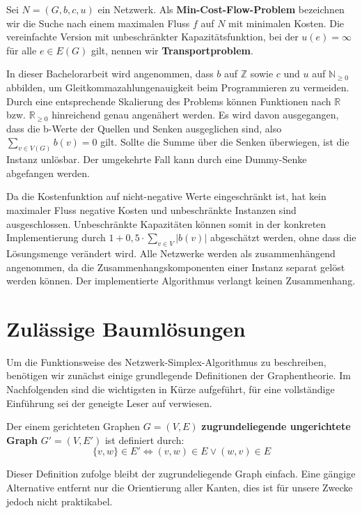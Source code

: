 \begin{defn}\label{defMCF} Sei $N=(G,b,c,u)$ ein Netzwerk. Als \textbf{Min-Cost-Flow-Problem} bezeichnen wir die Suche nach einem maximalen Fluss $f$ auf $N$ mit minimalen Kosten. Die vereinfachte Version mit unbeschränkter Kapazitätsfunktion, bei der $u(e)=\infty$ für alle $e\in E(G)$ gilt, nennen wir \textbf{Transportproblem}.\end{defn}

In dieser Bachelorarbeit wird angenommen, dass $b$ auf $\mathbb{Z}$ sowie $c$ und $u$ auf $\mathbb{N}_{\geq0}$ abbilden, um Gleitkommazahlungenauigkeit beim Programmieren zu vermeiden. Durch eine entsprechende Skalierung des Problems können Funktionen nach $\mathbb{R}$ bzw. $\mathbb{R}_{\geq 0}$ hinreichend genau angenähert werden. Es wird davon ausgegangen, dass die b-Werte der Quellen und Senken ausgeglichen sind, also $\sum_{v\in V(G)} b(v) = 0$ gilt. Sollte die Summe über die Senken überwiegen, ist die Instanz unlösbar. Der umgekehrte Fall kann durch eine Dummy-Senke\footnotemark{} abgefangen werden.


Da die Kostenfunktion auf nicht-negative Werte eingeschränkt ist, hat kein maximaler Fluss negative Kosten und unbeschränkte Instanzen sind ausgeschlossen. Unbeschränkte Kapazitäten können somit in der konkreten Implementierung durch $1+0,5\cdot\sum_{v\in V} |b(v)|$ abgeschätzt werden, ohne dass die Lösungsmenge verändert wird. Alle Netzwerke werden als zusammenhängend angenommen, da die Zusammenhangskomponenten einer Instanz separat gelöst werden können. Der implementierte Algorithmus verlangt keinen Zusammenhang.

\section{Zulässige Baumlösungen}\label{ch:BL}
Um die Funktionsweise des Netzwerk-Simplex-Algorithmus zu beschreiben, benötigen wir zunächst einige grundlegende Definitionen der Graphentheorie. Im Nachfolgenden sind die wichtigsten in Kürze aufgeführt, für eine vollständige Einführung sei der geneigte Leser auf \cite{Alma} verwiesen.

\begin{defn}Der einem gerichteten Graphen $G=(V,E)$ \textbf{zugrundeliegende ungerichtete Graph} $G'=(V,E')$ ist definiert durch:
\begin{equation*}\{v,w\}\in E' \iff (v,w) \in E \lor (w,v) \in E\end{equation*} \end{defn}
\begin{anm}Dieser Definition zufolge bleibt der zugrundeliegende Graph einfach. Eine gängige Alternative entfernt nur die Orientierung aller Kanten, dies ist für unsere Zwecke jedoch nicht praktikabel.\end{anm}

